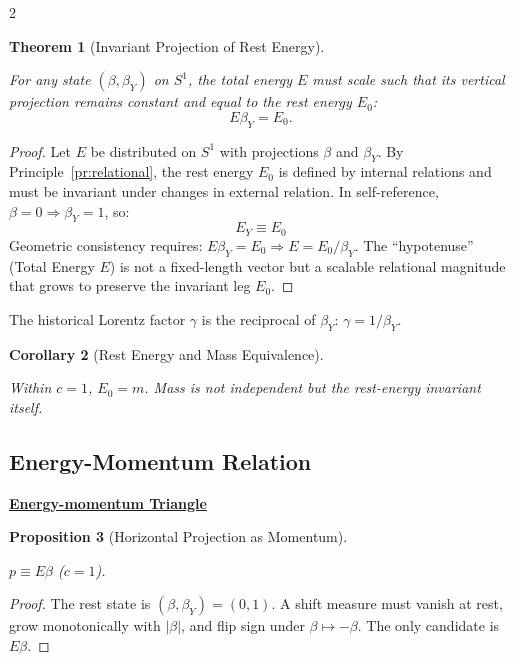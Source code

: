 \documentclass[10pt, a4paper]{article}
\newtheorem{theorem}{Theorem}[section]
\newtheorem{corollary}[theorem]{Corollary}
\newtheorem{proposition}[theorem]{Proposition}
\begin{document}
\begin{multicols}{2}
\begin{theorem}[Invariant Projection of Rest Energy]
\hypertarget{thm:restenergy}{}\label{thm:restenergy}
For any state $(\beta,\beta_Y)$ on $S^1$, the total energy $E$ must scale such that its vertical projection remains constant and equal to the rest energy $E_0$:
\[
E\beta_Y = E_0.
\]
\end{theorem}

\begin{proof}
Let $E$ be distributed on $S^1$ with projections $\beta$ and $\beta_Y$. By Principle~\ref{pr:relational}, the rest energy $E_0$ is defined by internal relations and must be invariant under changes in external relation. In self-reference, $\beta=0 \Longrightarrow \beta_Y=1$, so:
\[
\boxed{E_{Y} \equiv E_0}
\]
Geometric consistency requires:
$E\beta_Y = E_0 \Longrightarrow E = E_0/\beta_Y$.
The ``hypotenuse'' (Total Energy $E$) is not a fixed-length vector but a scalable relational magnitude that grows to preserve the invariant leg $E_0$.
\end{proof}

The historical Lorentz factor $\gamma$ is the reciprocal of $\beta_Y$: $\gamma = 1/\beta_Y$.

\begin{corollary}[Rest Energy and Mass Equivalence]
\hypertarget{cor:restmass}{}\label{cor:restmass}
Within $c=1$, $E_{0} = m$. Mass is not independent but the rest-energy invariant itself.
\end{corollary}

\subsection{Energy-Momentum Relation}

\begin{tcolorbox}[colback=gray!5, colframe=black!80!black, title=Desmos project]
\textbf{\href{https://www.desmos.com/geometry/mbkzikthkh}{Energy-momentum Triangle}}
\end{tcolorbox}

\begin{proposition}[Horizontal Projection as Momentum]
\hypertarget{prop:momentum}{}\label{prop:momentum}
$p \equiv E\beta$ \quad ($c=1$).
\end{proposition}

\begin{proof}
The rest state is $(\beta,\beta_Y)=(0,1)$. A shift measure must vanish at rest, grow monotonically with $|\beta|$, and flip sign under $\beta\mapsto -\beta$. The only candidate is $E\beta$.
\end{proof}


\end{multicols}
\end{document}
